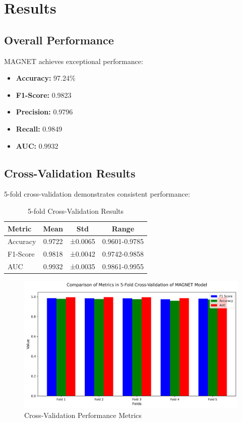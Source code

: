 \documentclass[a4paper,11pt]{article}
\begin{document}
\section{Results}
\subsection{Overall Performance}
MAGNET achieves exceptional performance:
\begin{itemize}
    \item \textbf{Accuracy:} 97.24\%
    \item \textbf{F1-Score:} 0.9823
    \item \textbf{Precision:} 0.9796
    \item \textbf{Recall:} 0.9849
    \item \textbf{AUC:} 0.9932
\end{itemize}

\subsection{Cross-Validation Results}
5-fold cross-validation demonstrates consistent performance:
\begin{table}[!htb]
  \centering
  \caption{5-fold Cross-Validation Results}
  \label{tab:cv_results}
  \begin{tabular}{@{}lccc@{}}
    \toprule
    \textbf{Metric} & \textbf{Mean} & \textbf{Std} & \textbf{Range} \\
    \midrule
    Accuracy & 0.9722 & ±0.0065 & 0.9601-0.9785 \\
    F1-Score & 0.9818 & ±0.0042 & 0.9742-0.9858 \\
    AUC & 0.9932 & ±0.0035 & 0.9861-0.9955 \\
    \bottomrule
  \end{tabular}
\end{table}

\begin{figure}[!htb]
  \centering
  \includegraphics[width=0.9\linewidth]{../fig_cv_metrics.png}
  \caption{Cross-Validation Performance Metrics}
  \label{fig:cv_metrics}
\end{figure}
\end{document}
